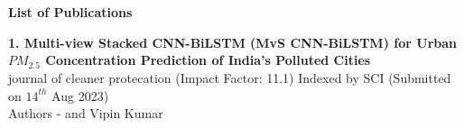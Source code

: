 
\chapter*{}
\vspace*{-3.5cm}

\vspace{11ex}
\addchaptertocentry{\listofpublication} %
    \textbf{\huge {List of Publications}}

\vspace{7ex}



\noindent\textbf{1. Multi-view Stacked CNN-BiLSTM (MvS CNN-BiLSTM) for Urban $PM_{2.5}$ Concentration Prediction of India's Polluted Cities }\\ journal of cleaner protecation (Impact Factor: 11.1) Indexed by SCI (Submitted on $14^{th}$ Aug 2023)\\
Authors - \fAuthor { }and  Vipin Kumar\\




\vspace*{0.7cm}
